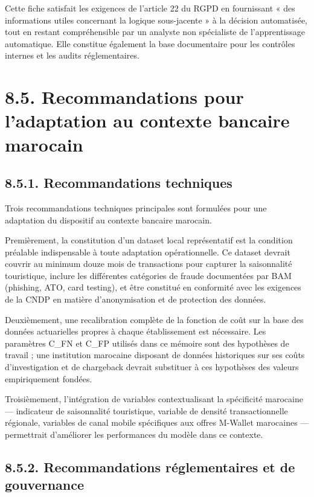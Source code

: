 Cette fiche satisfait les exigences de l'article 22 du RGPD en fournissant « des informations utiles concernant la logique sous-jacente » à la décision automatisée, tout en restant compréhensible par un analyste non spécialiste de l'apprentissage automatique. Elle constitue également la base documentaire pour les contrôles internes et les audits réglementaires.

\section{8.5. Recommandations pour l'adaptation au contexte bancaire marocain}

\subsection{8.5.1. Recommandations techniques}

Trois recommandations techniques principales sont formulées pour une adaptation du dispositif au contexte bancaire marocain.

Premièrement, la constitution d'un dataset local représentatif est la condition préalable indispensable à toute adaptation opérationnelle. Ce dataset devrait couvrir au minimum douze mois de transactions pour capturer la saisonnalité touristique, inclure les différentes catégories de fraude documentées par BAM (phishing, ATO, card testing), et être constitué en conformité avec les exigences de la CNDP en matière d'anonymisation et de protection des données.

Deuxièmement, une recalibration complète de la fonction de coût sur la base des données actuarielles propres à chaque établissement est nécessaire. Les paramètres C\_FN et C\_FP utilisés dans ce mémoire sont des hypothèses de travail ; une institution marocaine disposant de données historiques sur ses coûts d'investigation et de chargeback devrait substituer à ces hypothèses des valeurs empiriquement fondées.

Troisièmement, l'intégration de variables contextualisant la spécificité marocaine — indicateur de saisonnalité touristique, variable de densité transactionnelle régionale, variables de canal mobile spécifiques aux offres M-Wallet marocaines — permettrait d'améliorer les performances du modèle dans ce contexte.

\subsection{8.5.2. Recommandations réglementaires et de gouvernance}

